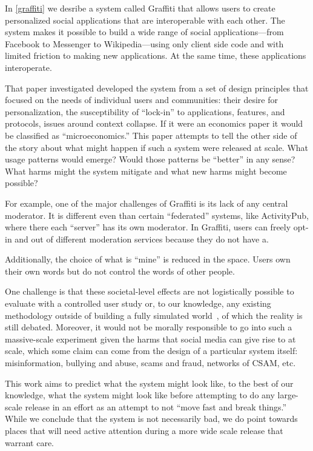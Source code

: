 In \ref{graffiti} we desribe a system called Graffiti that
allows users to create personalized social applications
that are interoperable with each other.
The system makes it possible to build a wide range of social applications---from
Facebook to Messenger to Wikipedia---using only client side code
and with limited friction to making new applications. At the same
time, these applications interoperate.

That paper investigated developed the system from a set of design principles
that focused on the needs of individual users and communities:
their desire for personalization, the susceptibility of ``lock-in''
to applications, features, and protocols, issues around context collapse.
If it were an economics paper it would be classified as ``microeconomics.''
This paper attempts to tell the other side of the story about what might happen
if such a system were released at scale.
What usage patterns would emerge?
Would those patterns be ``better'' in any sense?
What harms might the system mitigate and what new harms might become possible?

For example, one of the major challenges of Graffiti is its lack of any central moderator.
It is different even than certain ``federated'' systems, like ActivityPub, where there
each ``server'' has its own moderator. In Graffiti, users can freely opt-in and out of different
moderation services because they do not have a.

Additionally, the choice of what is ``mine'' is reduced in the space. Users own their own words
but do not control the words of other people.

One challenge is that these societal-level effects are not logistically possible
to evaluate with a controlled user study or, to our knowledge, any existing methodology
outside of building a fully simulated world~\cite{}, of which the reality is still debated.
Moreover, it would not be morally responsible to go into such a massive-scale experiment
given the harms that social media can give rise to
at scale, which some claim can come from the design of a particular system itself:
misinformation, bullying and abuse, scams and fraud, networks of CSAM, etc.

This work aims to predict what the system might look like, to the best of our knowledge,
what the system might look like before attempting to do any large-scale release in an effort
as an attempt to not ``move fast and break things.'' While we conclude that the system
is not necessarily bad, we do point towards places that will need active attention during
a more wide scale release that warrant care.

